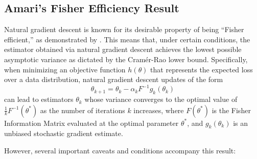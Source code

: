 \subsection{Amari's Fisher Efficiency Result}

Natural gradient descent is known for its desirable property of being ``Fisher efficient,'' as demonstrated by \citet{amari1998natural}. This means that, under certain conditions, the estimator obtained via natural gradient descent achieves the lowest possible asymptotic variance as dictated by the Cramér-Rao lower bound. Specifically, when minimizing an objective function \( h(\theta) \) that represents the expected loss over a data distribution, natural gradient descent updates of the form
\[
\theta_{k+1} = \theta_k - \alpha_k F^{-1} g_k(\theta_k)
\]
can lead to estimators \( \theta_k \) whose variance converges to the optimal value of \( \frac{1}{k} F^{-1}(\theta^*) \) as the number of iterations \( k \) increases, where \( F(\theta^*) \) is the Fisher Information Matrix evaluated at the optimal parameter \( \theta^* \), and \( g_k(\theta_k) \) is an unbiased stochastic gradient estimate.

However, several important caveats and conditions accompany this result:


